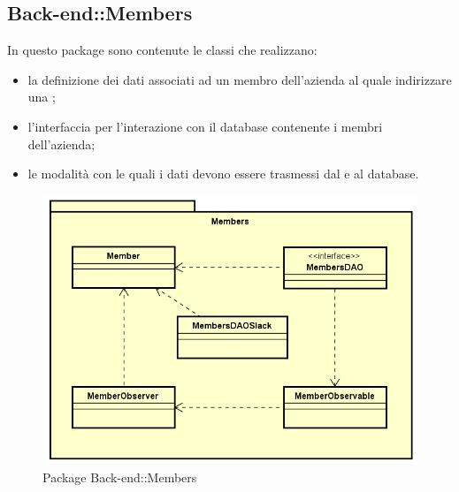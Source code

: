 \subsection{Back-end::Members}
In questo package sono contenute le classi che realizzano: \begin{itemize} \item la definizione dei dati associati ad un membro dell'azienda al quale indirizzare una ; \item l'interfaccia per l'interazione con il database contenente i membri dell'azienda; \item le modalità con le quali i dati devono essere trasmessi dal e al database. \end{itemize}
\begin{figure}[h] \centering \includegraphics[width=\textwidth,height=\textheight,keepaspectratio]{images/diagrams/back-end/Official_Backend_0304/Member.png}
	\caption{Package Back-end::Members}
\end{figure}
\newpage

